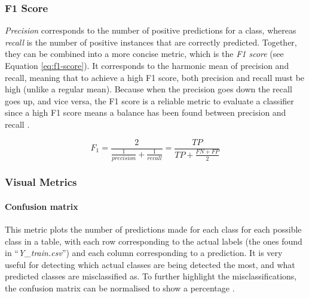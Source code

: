 \subsubsection{F1 Score}

\textit{Precision} corresponds to the number of positive predictions for a class, whereas \textit{recall} is the number of positive instances  that are correctly predicted. Together, they can be combined into a more concise metric, which is the \textit{F1 score} (see Equation \ref{eq:f1-score}). It corresponds to the harmonic mean of precision and recall, meaning that to achieve a high F1 score, both precision and recall must be high (unlike a regular mean). Because when  the precision goes down the recall goes up, and vice versa, the F1 score is a reliable metric to evaluate a classifier since a high F1 score means a balance has been found between precision and recall \cite{Geron2019}.

\begin{equation}
\label{eq:f1-score}
    F_{1} = \frac{2}{\frac{1}{precision} + \frac{1}{recall}} = \frac{TP}{TP+\frac{FN + FP}{2}}
\end{equation}

\subsubsection{Visual Metrics}

\paragraph{Confusion matrix} This metric plots the number of predictions made for each class for each possible class in a table, with each row corresponding to the actual labels (the ones found in ``\textit{Y\_train.csv}'') and each column corresponding to a prediction. It is very useful for detecting which actual classes are being detected the most, and what predicted classes are misclassified as. To further highlight the misclassifications, the confusion matrix can be normalised to show a percentage \cite{Geron2019}.

